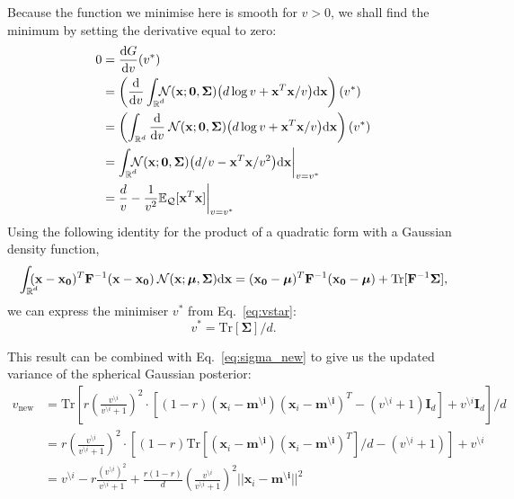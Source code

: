 \documentclass[11pt]{article}
\newcommand{\vek}[1]{\ensuremath{\mathbf{#1}}}
\newcommand{\byd}{\ensuremath{\mathrm{d}}}
\newcommand{\norm}{\ensuremath{\:\mathcal{N}}}
\newcommand{\unity}{\ensuremath{\mathbf{I}}}
\newcommand{\ee}{\ensuremath{\mathbb{E}}}
\newcommand{\real}{\ensuremath{\mathbb{R}}}
\newcommand{\intr}{\ensuremath{\int_{\real^d}}}
\newcommand{\intrc}{\ensuremath{\int_{\rlap{\scriptsize$\real^d$}}\:}}
\newcommand{\intrcc}{\ensuremath{\int_{\rlap{\scriptsize$\real^d$}}}}
\begin{document}
Because the function we minimise here is smooth for $v > 0$, we shall 
find the minimum by setting the derivative equal to zero:
\begin{align}
	0 &= \frac{\byd G}{\byd v}(v^*) \\
	&= \left(\frac{\byd}{\byd v}\intrcc
		\norm(\vek{x}; \vek{0}, \vek{\Sigma})
		\big(d\log v + \vek{x}^T\vek{x}/v\big)\byd \vek{x}\right)(v^*) \\
	&= \left(\intr
		\frac{\byd}{\byd v}\norm(\vek{x}; \vek{0}, \vek{\Sigma})
		\big(d\log v + \vek{x}^T\vek{x}/v\big)\byd \vek{x}\right)(v^*) \\
	&= \intrcc
		\norm(\vek{x}; \vek{0}, \vek{\Sigma})
		\big(d/v - \vek{x}^T\vek{x}/v^2\big)\byd \vek{x}\bigg|_{v=v^*} \\
	&= \frac{d}{v} - \frac{1}{v^2} \ee_{\mathcal{Q}}[\vek{x}^T\vek{x}] 
\bigg|_{v=v^*}
	\label{eq:vstar}
\end{align}
Using the following identity for the product of a quadratic form with 
a Gaussian density function,
\begin{equation}
	\intrc
		(\vek{x}-\vek{x_0})^T\vek{F}^{-1}(\vek{x}-\vek{x_0})
		\norm(\vek{x}; \boldsymbol{\mu}, \vek{\Sigma}) \byd\vek{x}
	= (\vek{x_0} - \boldsymbol{\mu})^T\vek{F}^{-1}(\vek{x_0} - \boldsymbol{\mu})
	+ \text{Tr}[\vek{F}^{-1}\vek{\Sigma}],
\end{equation}
we can express the minimiser $v^*$ from Eq.~\eqref{eq:vstar}:
\begin{equation}
	v^* = \text{Tr}[\vek{\Sigma}] / d.
\end{equation}

This result can be combined with Eq.~\eqref{eq:sigma_new} to give us the 
updated variance of the spherical Gaussian posterior:
\begin{align}
		v_{\text{new}} &=
			\text{Tr}\left[r\left(\frac{v^{\setminus i}}{v^{\setminus i} 
			+ 1}\right)^2
			\cdot\left[
				(1 - r)(\vek{x}_i - \vek{m^{\setminus i}})(\vek{x}_i - \vek{m^{\setminus i}})^T
				- (v^{\setminus i} + 1)\unity_d
			\right]
			+ v^{\setminus i}\unity_d\right] / d \\
		&=
			r\left(\frac{v^{\setminus i}}{v^{\setminus i} + 1}\right)^2
			\cdot\left[(1 - r)
			\text{Tr}\left[(\vek{x}_i - \vek{m^{\setminus i}})
									   (\vek{x}_i - \vek{m^{\setminus i}})^T\right] / d
				- (v^{\setminus i} + 1)\right]
			+ v^{\setminus i} \\
		&=  v^{\setminus i}
			- r \frac{(v^{\setminus i})^2}{v^{\setminus i} + 1}
			+ \frac{r(1 - r)}{d}
				\left(\frac{v^{\setminus i}}{v^{\setminus i} + 1}\right)^2
				||\vek{x}_i - \vek{m^{\setminus i}}||^2
		\label{eq:vnew}
\end{align}
\end{document}
